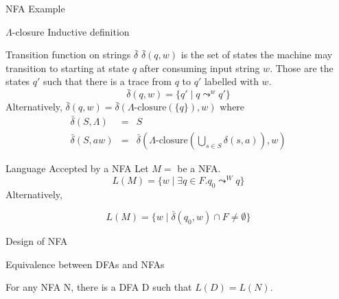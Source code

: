 \documentclass{beamer}
\begin{document}
\begin{frame}{NFA Example}

\end{frame}

\begin{frame}{$\Lambda$-closure}
Inductive definition
\end{frame}

\begin{frame}{Transition function on strings $\bar{\delta}$}
$\bar{\delta}(q,w)$ is the set of states the machine 
may transition to starting at state $q$ after consuming input string $w$.
Those are the states $q'$ such that there is a trace from $q$ to $q'$ labelled with $w$. 
\[ \bar{\delta}(q,w) =\{q' \mid q\leadsto^{w} q'\}
\] 
Alternatively, \(\bar{\delta}(q,w) = \bar{\delta}(\Lambda\mbox{-closure}(\{q\}),w)\) where
\begin{eqnarray*}
\bar{\delta}(S,\Lambda) &=& S \\ 
\bar{\delta}(S,aw) &=&  \bar{\delta}(\Lambda\mbox{-closure}(\bigcup_{s\in S}\delta(s,a)),w)
\end{eqnarray*}
\end{frame}

\begin{frame}{Language Accepted by a NFA}
Let $M=$ be a NFA. 
\[L(M) = \{w \mid \exists q\in F. q_0\leadsto^{W} q\}\]
Alternatively, 

\[ L(M) = \{w \mid \bar{\delta}(q_0,w) \cap F\neq\emptyset\}\]

\end{frame}

\begin{frame}{Design of NFA}

\end{frame}

\begin{frame}{Equivalence between DFAs and NFAs}
\begin{theorem} For any NFA N, there is a DFA D such that \(L(D)=L(N)\).  
\end{theorem}
\end{frame}
\end{document}
